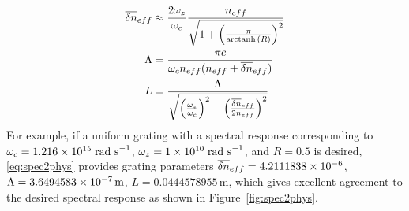 %
\begin{align}
\label{eq:spec2phys}
    \overline{\delta n}_{eff} &\approx \frac{2\omega_z}{\omega_c} \frac{n_{eff}}{\sqrt{1 + \left(\frac{\pi}{\operatorname{arctanh}{(R)}} \right)^2}}
    \\
    \Lambda &= \frac{\pi c}{\omega_c n_{eff} (n_{eff} +\overline{\delta n}_{eff})}
    \\
    L &= \frac{\Lambda}{\sqrt{\left( \frac{\omega_z}{\omega_c} \right)^2 - \left( \frac{\overline{\delta n}_{eff}}{2n_{eff}} \right)^2}}
\end{align}
%
For example, if a uniform grating with a spectral response corresponding to $\omega_c = 1.216\times 10^{15}\; \text{rad s}^{-1}$, $\omega_z = 1\times 10^{10}\; \text{rad s}^{-1}$, and $R = 0.5$ is desired, 
\eqref{eq:spec2phys} provides grating parameters $\overline{\delta n}_{eff}= 4.2111838\times 10^{-6}$, $\Lambda = 3.6494583\times 10^{-7}\,\text{m}$, $L = 0.0444578955\,\text{m}$, 
which gives excellent agreement to the desired spectral response as shown in Figure~\ref{fig:spec2phys}.
%
%
